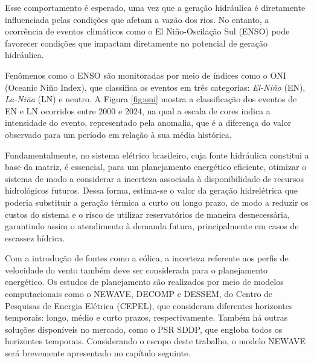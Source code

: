 \begin{figure}[!ht]
	{}
	{}
\end{figure}

Esse comportamento é esperado, uma vez que a geração hidráulica é diretamente influenciada pelas condições
que afetam a vazão dos rios. No entanto, a ocorrência de eventos climáticos como o El Niño-Oscilação Sul (ENSO) pode
favorecer condições que impactam diretamente no potencial de geração hidráulica. \cite{de2012influencia}

\begin{figure}[!ht]
	{}
	{}
\end{figure}

Fenômenos como o ENSO são monitoradas por meio de índices como o ONI (Oceanic Niño Index), que classifica os 
eventos em três categorias: \textit{El-Niño} (EN), \textit{La-Niña} (LN) e neutro. A Figura \ref{fig:oni} mostra a 
classificação dos eventos de EN e LN ocorridos entre 2000 e 2024, na qual a escala de cores indica a intensidade do 
evento, representado pela anomalia, que é a diferença do valor observado para um período em relação à sua média histórica.

Fundamentalmente, no sistema elétrico brasileiro, cuja fonte hidráulica constitui a base da matriz, é essencial, para um
planejamento energético eficiente, otimizar o sistema de modo a considerar a incerteza associada à disponibilidade de recursos
hidrológicos futuros. Dessa forma, estima-se o valor da geração hidrelétrica que poderia substituir a geração térmica a curto
ou longo prazo, de modo a reduzir os custos do sistema e o risco de utilizar reservatórios de maneira desnecessária, garantindo
assim o atendimento à demanda futura, principalmente em casos de escassez hídrica.

Com a introdução de fontes como a eólica, a incerteza referente aos perfis de velocidade do vento também deve ser considerada
para o planejamento energético. Os estudos de planejamento são realizados por meio de modelos computacionais como o NEWAVE, 
DECOMP e DESSEM, do Centro de Pesquisas de Energia Elétrica (CEPEL), que consideram diferentes horizontes temporais: longo, 
médio e curto prazos, respectivamente. Também há outras soluções disponíveis no mercado, como o PSR SDDP, que engloba todos
os horizontes temporais. Considerando o escopo deste trabalho, o modelo NEWAVE será brevemente apresentado no capítulo seguinte.

